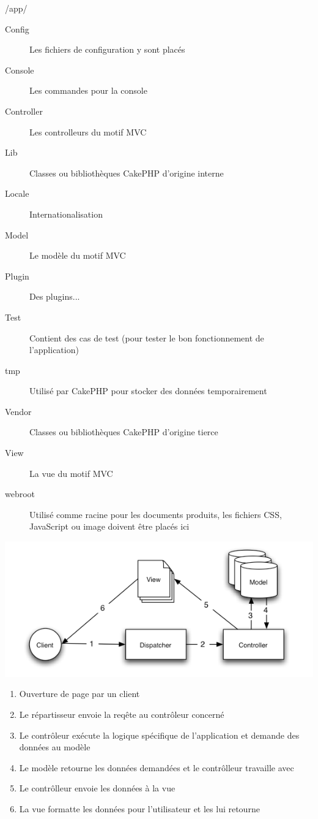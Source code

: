 \begin{frame}{/app/}
\begin{description}
  \item [Config] Les fichiers de configuration y sont placés
  \item [Console] Les commandes pour la console
  \item [Controller] Les controlleurs du motif MVC
  \item [Lib] Classes ou bibliothèques CakePHP d'origine interne
  \item [Locale] Internationalisation
  \item [Model] Le modèle du motif MVC
  \item [Plugin] Des plugins...
  \item [Test] Contient des cas de test (pour tester le bon fonctionnement de l'application)
  \item [tmp] Utilisé par CakePHP pour stocker des données temporairement
  \item [Vendor] Classes ou bibliothèques CakePHP d'origine tierce
  \item [View] La vue du motif MVC
  \item [webroot] Utilisé comme racine pour les documents produits, les fichiers CSS, JavaScript ou image doivent être placés ici
\end{description}
\end{frame}

\begin{frame}
\begin{center}
\includegraphics[scale=0.50]{img/basic_mvc.png}

\begin{enumerate}
  \item Ouverture de page par un client
  \item Le répartisseur envoie la reqête au contrôleur concerné
  \item Le contrôleur exécute la logique spécifique de l’application et demande des données au modèle
  \item Le modèle retourne les données demandées et le contrôlleur travaille avec
  \item Le contrôlleur envoie les données à la vue
  \item La vue formatte les données pour l'utilisateur et les lui retourne
\end{enumerate}
\end{center}
\end{frame}

